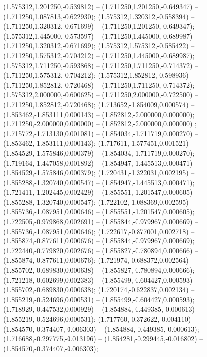  (1.575312,1.201250,-0.539812) -- (1.711250,1.201250,-0.649347) -- (1.711250,1.087813,-0.622930);
 (1.575312,1.320312,-0.558394) -- (1.711250,1.320312,-0.671699) -- (1.711250,1.201250,-0.649347);
 (1.575312,1.445000,-0.573597) -- (1.711250,1.445000,-0.689987) -- (1.711250,1.320312,-0.671699);
 (1.575312,1.575312,-0.585422) -- (1.711250,1.575312,-0.704212) -- (1.711250,1.445000,-0.689987);
 (1.575312,1.711250,-0.593868) -- (1.711250,1.711250,-0.714372) -- (1.711250,1.575312,-0.704212);
 (1.575312,1.852812,-0.598936) -- (1.711250,1.852812,-0.720468) -- (1.711250,1.711250,-0.714372);
 (1.575312,2.000000,-0.600625) -- (1.711250,2.000000,-0.722500) -- (1.711250,1.852812,-0.720468);
 (1.713652,-1.854009,0.000574) -- (1.853462,-1.853111,0.000143) -- (1.852812,-2.000000,0.000000);
 (1.711250,-2.000000,0.000000) -- (1.852812,-2.000000,0.000000) ;
 (1.715772,-1.713130,0.001081) -- (1.854034,-1.711719,0.000270) -- (1.853462,-1.853111,0.000143);
 (1.717611,-1.577451,0.001521) -- (1.854529,-1.575846,0.000379) -- (1.854034,-1.711719,0.000270);
 (1.719164,-1.447058,0.001892) -- (1.854947,-1.445513,0.000471) -- (1.854529,-1.575846,0.000379);
 (1.720431,-1.322031,0.002195) -- (1.855288,-1.320740,0.000547) -- (1.854947,-1.445513,0.000471);
 (1.721411,-1.202445,0.002429) -- (1.855551,-1.201547,0.000605) -- (1.855288,-1.320740,0.000547);
 (1.722102,-1.088369,0.002595) -- (1.855736,-1.087951,0.000646) -- (1.855551,-1.201547,0.000605);
 (1.722505,-0.979868,0.002691) -- (1.855844,-0.979967,0.000669) -- (1.855736,-1.087951,0.000646);
 (1.722617,-0.877001,0.002718) -- (1.855874,-0.877611,0.000676) -- (1.855844,-0.979967,0.000669);
 (1.722440,-0.779820,0.002676) -- (1.855827,-0.780894,0.000666) -- (1.855874,-0.877611,0.000676);
 (1.721974,-0.688372,0.002564) -- (1.855702,-0.689830,0.000638) -- (1.855827,-0.780894,0.000666);
 (1.721218,-0.602699,0.002383) -- (1.855499,-0.604427,0.000593) -- (1.855702,-0.689830,0.000638);
 (1.720174,-0.522837,0.002134) -- (1.855219,-0.524696,0.000531) -- (1.855499,-0.604427,0.000593);
 (1.718929,-0.447532,0.000929) -- (1.854884,-0.449385,-0.000613) -- (1.855219,-0.524696,0.000531);
 (1.717760,-0.372622,-0.004110) -- (1.854570,-0.374407,-0.006303) -- (1.854884,-0.449385,-0.000613);
 (1.716688,-0.297775,-0.013196) -- (1.854281,-0.299445,-0.016802) -- (1.854570,-0.374407,-0.006303);

